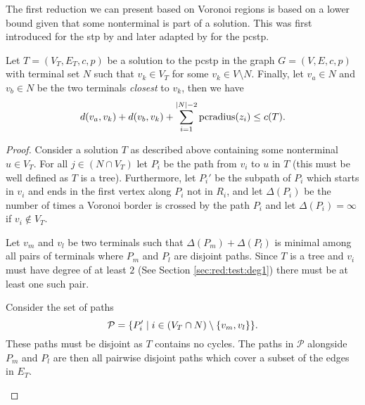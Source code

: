 The first reduction we can present based on Voronoi regions is based on a lower bound given that some nonterminal is
part of a solution. This was first introduced for the \gls{stp} by \citet{polzin2001improved} and later adapted by
\citet{rehfeldt2016reduction} for the \gls{pcstp}.

\begin{theorem}\label{thm:vor:1}
  Let $T = (V_T, E_T, c, p)$ be a solution to the \gls{pcstp} in the graph $G = (V, E, c, p)$ with terminal set $N$ such that
  $v_k \in V_T$ for some $v_k \in V \setminus N$. Finally, let $v_a \in N$ and $v_b \in N$ be the two terminals \textit{closest}
  to $v_k$, then we have
  $$d(v_a, v_k) + d(v_b, v_k) + \sum_{i = 1}^{|N| - 2} \operatorname{pcradius}(z_i) \leq c(T)\mathnormal{.}$$
\end{theorem}
\begin{proof}
  Consider a solution $T$ as described above containing some nonterminal $u \in V_T$.
  For all $j \in (N \cap V_T)$ let $P_i$ be the
  path from $v_i$ to $u$ in $T$ (this must be well defined as $T$ is a tree). Furthermore,
  let $P_i'$ be the subpath of $P_i$ which starts in $v_i$ and ends in the first vertex along
  $P_i$ not in $R_i$, and
  let $\Delta(P_i)$ be the number of times a Voronoi border is crossed by the path $P_i$ and
  let $\Delta(P_i) = \infty$ if $v_i \not\in V_T$.

  Let $v_m$ and $v_l$ be two terminals such that $\Delta(P_m) + \Delta(P_l)$ is minimal among
  all pairs of terminals where $P_m$ and $P_l$ are disjoint paths. Since $T$ is a tree and
  $v_i$ must have degree of at least $2$ (See Section \ref{sec:red:test:deg1}) there must
  be at least one such pair.

  Consider the set of paths
  $$\mathcal{P} = \{P_i' \mid i \in (V_T \cap N) \setminus \{v_m, v_l\} \}
  \mathnormal{.}$$
  These paths must be disjoint as $T$ contains no cycles. The paths in $\mathcal{P}$
  alongside $P_m$ and $P_l$ are then all pairwise disjoint paths which cover a subset of the
  edges
  in $E_T$.

 \begin{figure}[h!]
     \centering
\end{figure}
\end{proof}
